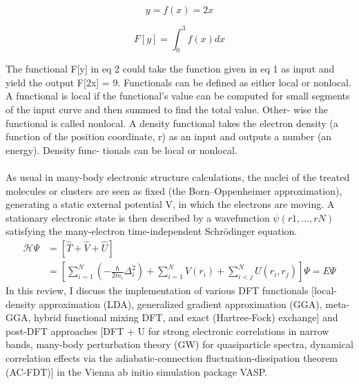 \documentclass[12pt, letterpaper]{article}
\newcommand*{\1}{\hspace{1pt}}
\begin{document}
    \begin{equation}
        y = f(x) = 2x
    \end{equation}
    
    \begin{equation}
        F[y] = \int ^{3} _{0} f(x) dx
    \end{equation}
    
    The functional F[y] in eq 2 could take the function given in
    eq 1 as input and yield the output F[2x] = 9. Functionals can
    be deﬁned as either local or nonlocal. A functional is local if the
    functional’s value can be computed for small segments of the
    input curve and then summed to ﬁnd the total value. Other-
    wise the functional is called nonlocal. A density functional takes
    the electron density (a function of the position coordinate, r) as
    an input and outputs a number (an energy). Density func-
    tionals can be local or nonlocal. \\ 
     \\ 

    As usual in many-body electronic structure calculations, the nuclei of the treated molecules or clusters are seen as fixed (the Born–Oppenheimer 
    approximation), generating a static external potential V, in which the electrons are moving. A stationary electronic state is then described by a 
    wavefunction $\psi (r1, …, rN)$ satisfying the many-electron time-independent Schrödinger equation. 
    \begin{equation}
        \begin{split}
        \mathcal{H} \Psi & = \left[\hat{T} + \hat{V} + \hat{U} \right] \\
        & =\left[\sum ^{N} _{i=1}\left(-\frac{\hbar}{2m_{i}}\Delta ^{2}_{i}\right)+ \sum^{N}_{i=1}V(r_{i})+\sum^{N}_{i<j}U(r_{i},r_{j})\right]\Psi = E\Psi
        \end{split}
    \end{equation}
    In this review, I discuss the implementation of various DFT functionals [local-density approximation (LDA), generalized gradient approximation (GGA), 
    meta-GGA, hybrid functional mixing DFT, and exact (Hartree-Fock) exchange] and post-DFT approaches 
    [DFT + U for strong electronic correlations in narrow bands, many-body perturbation theory (GW) for quasiparticle spectra, 
    dynamical correlation effects via the adiabatic-connection fluctuation-dissipation theorem (AC-FDT)] in the 
    Vienna ab initio simulation package VASP. \\ 
\end{document}
